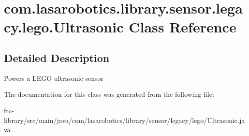 \hypertarget{classcom_1_1lasarobotics_1_1library_1_1sensor_1_1legacy_1_1lego_1_1_ultrasonic}{}\section{com.\+lasarobotics.\+library.\+sensor.\+legacy.\+lego.\+Ultrasonic Class Reference}
\label{classcom_1_1lasarobotics_1_1library_1_1sensor_1_1legacy_1_1lego_1_1_ultrasonic}


\subsection{Detailed Description}
Powers a L\+E\+G\+O ultrasonic sensor 

The documentation for this class was generated from the following file\+:\begin{DoxyCompactItemize}
\item 
ftc-\/library/src/main/java/com/lasarobotics/library/sensor/legacy/lego/Ultrasonic.\+java\end{DoxyCompactItemize}
